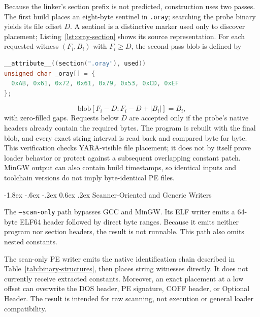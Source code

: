 \documentclass[11pt,twocolumn]{article}
\makeatletter
\newcommand{\code}[1]{\texttt{#1}}
\renewcommand\subsection{\@startsection{subsection}{2}{\z@}%
  {-1.8ex \@plus -.6ex \@minus -.2ex}%
  {0.6ex \@plus .2ex}%
  {\normalfont\normalsize\bfseries}}
\makeatother
\begin{document}
Because the linker's section prefix is not predicted, construction uses two
passes. The first build places an eight-byte sentinel in \code{.oray}; searching
the probe binary yields its file offset $D$. A sentinel is a distinctive marker
used only to discover placement; Listing~\ref{lst:oray-section} shows its source
representation. For each requested witness
$(F_i,B_i)$ with $F_i\ge D$, the second-pass blob is defined by
\begin{minipage}{\linewidth}
\begin{lstlisting}[language=C,caption={Generated C declaration that places the probe or final blob in \code{.oray}.},label={lst:oray-section}]
__attribute__((section(".oray"), used))
unsigned char _oray[] = {
  0xAB, 0x61, 0x72, 0x61, 0x79, 0x53, 0xCD, 0xEF
};
\end{lstlisting}
\end{minipage}
\begin{equation}
  \mathrm{blob}[F_i-D:F_i-D+|B_i|]=B_i,
\end{equation}
with zero-filled gaps. Requests below $D$ are accepted only if the probe's native
headers already contain the required bytes. The program is rebuilt with the
final blob, and every exact string interval is read back and compared byte for
byte. This verification checks YARA-visible file placement; it does not by
itself prove loader behavior or protect against a subsequent overlapping
constant patch. MinGW output can also contain build timestamps, so identical
inputs and toolchain versions do not imply byte-identical PE files.

\subsection{Scanner-Oriented and Generic Writers}

The \code{--scan-only} path bypasses GCC and MinGW. Its ELF writer emits a
64-byte ELF64 header followed by direct byte ranges. Because it emits neither
program nor section headers, the result is not runnable. This path also omits
nested constants.

The scan-only PE writer emits the native identification chain described in
Table~\ref{tab:binary-structures}, then places string witnesses directly. It
does not currently receive extracted constants. Moreover, an exact placement at
a low offset can overwrite the DOS header, PE signature, COFF header, or
Optional Header. The result is intended for raw scanning, not execution or
general loader compatibility.
\end{document}
